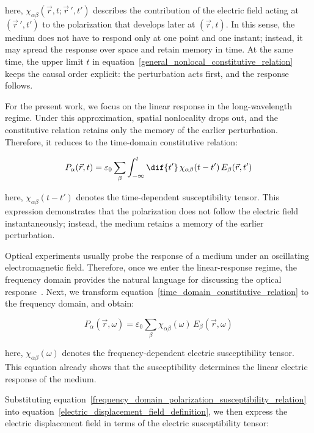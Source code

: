 here, $\chi_{\alpha\beta}(\vec{r},t;\vec{r}\,',t')$ describes the contribution of the electric field acting at $(\vec{r}\,',t')$ to the polarization that develops later at $(\vec{r},t)$.
In this sense, the medium does not have to respond only at one point and one instant;
instead, it may spread the response over space and retain memory in time.
At the same time, the upper limit $t$ in equation~\eqref{general_nonlocal_constitutive_relation} keeps the causal order explicit: the perturbation acts first, and the response follows.

For the present work, we focus on the linear response in the long-wavelength regime.
Under this approximation, spatial nonlocality drops out, and the constitutive relation retains only the memory of the earlier perturbation.
Therefore, it reduces to the time-domain constitutive relation:

\begin{equation}
    P_\alpha(\vec{r},t)=
    \varepsilon_0\sum_\beta\int_{-\infty}^{t}\dif{t'}\,\chi_{\alpha\beta}(t-t')\,E_\beta(\vec{r},t')
\label{time_domain_constitutive_relation}
\end{equation}

here, $\chi_{\alpha\beta}(t-t')$ denotes the time-dependent susceptibility tensor.
This expression demonstrates that the polarization does not follow the electric field instantaneously;
instead, the medium retains a memory of the earlier perturbation.

Optical experiments usually probe the response of a medium under an oscillating electromagnetic field.
Therefore, once we enter the linear-response regime, the frequency domain provides the natural language for discussing the optical response~\cite{han2023temperature}.
Next, we transform equation~\eqref{time_domain_constitutive_relation} to the frequency domain, and obtain:

\begin{equation}
    P_\alpha(\vec{r},\omega)=\varepsilon_0\sum_\beta\chi_{\alpha\beta}(\omega)\,E_\beta(\vec{r},\omega)
\label{frequency_domain_polarization_susceptibility_relation}
\end{equation}

here, $\chi_{\alpha\beta}(\omega)$ denotes the frequency-dependent electric susceptibility tensor.
This equation already shows that the susceptibility determines the linear electric response of the medium.

Substituting equation~\eqref{frequency_domain_polarization_susceptibility_relation} into equation~\eqref{electric_displacement_field_definition},
we then express the electric displacement field in terms of the electric susceptibility tensor:


